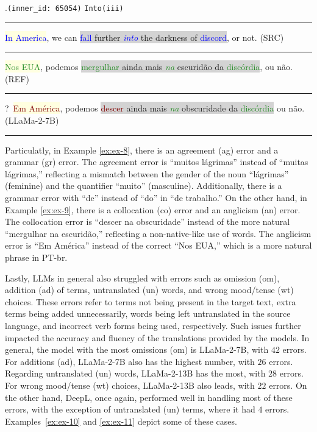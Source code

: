\ex.\texttt{(inner\_id: 65054)} \hfill  \texttt{Into(iii)}\\[0.3ex]
\noindent\rule{\linewidth}{0.9pt}
\colorbox{lightyellow}{\textcolor{blue}{In America}}, we can \colorbox{lightgray}{\textcolor{blue}{fall} further \textcolor{blue}{\emph{into}} the darkness of \textcolor{blue}{discord}}, or not. (SRC) \label{ex:ex-9} \\[-0.3ex]
\noindent\rule{\linewidth}{0.3pt}
\colorbox{lightyellow}{\textcolor{ForestGreen}{Nos EUA}}, podemos \colorbox{lightgray}{\textcolor{ForestGreen}{mergulhar} ainda mais \textcolor{ForestGreen}{\emph{na}} escuridão da \textcolor{ForestGreen}{discórdia}}, ou não.\\(REF) \\[-0.3ex]
\noindent\rule{\linewidth}{0.3pt}
?~\colorbox{lightyellow}{\textcolor{Maroon}{Em América}}, podemos \colorbox{lightgray}{\textcolor{Maroon}{descer} ainda mais \textcolor{ForestGreen}{\emph{na}} obscuridade da \textcolor{ForestGreen}{discórdia}} ou não. (LLaMa-2-7B) \\[-0.3ex]
\noindent\rule{\linewidth}{0.9pt}

Particulatly, in Example \ref{ex:ex-8}, there is an agreement (ag) error and a grammar (gr) error. The agreement error is ``muitos lágrimas'' instead of ``muitas lágrimas,'' reflecting a mismatch between the gender of the noun ``lágrimas'' (feminine) and the quantifier ``muito'' (masculine). Additionally, there is a grammar error with ``de'' instead of ``do'' in ``de trabalho.'' On the other hand, in Example \ref{ex:ex-9}, there is a collocation (co) error and an anglicism (an) error. The collocation error is ``descer na obscuridade'' instead of the more natural ``mergulhar na escuridão,'' reflecting a non-native-like use of words. The anglicism error is ``Em América'' instead of the correct ``Nos EUA,'' which is a more natural phrase in PT-br.

Lastly, LLMs in general also struggled with errors such as omission (om), addition (ad) of terms, untranslated (un) words, and wrong mood/tense (wt) choices. These errors refer to terms not being present in the target text, extra terms being added unnecessarily, words being left untranslated in the source language, and incorrect verb forms being used, respectively. Such issues further impacted the accuracy and fluency of the translations provided by the models. In general, the model with the most omissions (om) is LLaMa-2-7B, with $42$ errors. For additions (ad), LLaMa-2-7B also has the highest number, with $26$ errors. Regarding untranslated (un) words, LLaMa-2-13B has the most, with $28$ errors. For wrong mood/tense (wt) choices, LLaMa-2-13B also leads, with $22$ errors. On the other hand, DeepL, once again, performed well in handling most of these errors, with the exception of untranslated (un) terms, where it had $4$ errors. Examples~\ref{ex:ex-10} and \ref{ex:ex-11} depict some of these cases.

